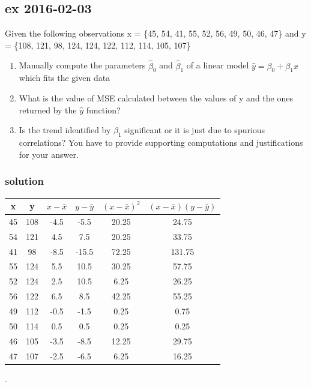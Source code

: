 \documentclass[a4paper,12pt,titlepage]{article} %
\begin{document}
\subsection{ex 2016-02-03}
Given the following observations x = \{45, 54, 41, 55, 52, 56, 49, 50, 46, 47\} and y = \{108, 121, 98, 124, 124, 122, 112, 114, 105, 107\}
\begin{enumerate}
\item Manually compute the parameters $ \hat{\beta}_{0} $ and $ \hat{\beta}_{1} $ of a linear model $ \hat{y} = \beta_{0} + \beta_{1} x $ which fits the given data
\item What is the value of MSE calculated between the values of y and the ones returned by the $ \hat{y} $ function?
\item Is the trend identified by $ \hat{\beta}_{1} $ significant or it is just due to spurious correlations? You have to provide supporting computations and justifications for your answer. 
\end{enumerate}

\subsubsection{solution}
  \begin{tabular}{|c|c|c|c|c|c|}
    \hline
    x & y & $ x - \bar{x} $ & $ y - \bar{y} $ & $ (x - \bar{x})^{2} $ & $ (x - \bar{x})(y - \bar{y}) $ \\
    \hline
    45	& 108	& -4.5	& -5.5	& 20.25	& 24.75 	\\
    \hline
    54	& 121	& 4.5	& 7.5	& 20.25	& 33.75 	\\
    \hline
    41	& 98	& -8.5	& -15.5	& 72.25	& 131.75	\\
    \hline
    55	& 124	& 5.5	& 10.5	& 30.25	& 57.75 	\\
    \hline
    52	& 124	& 2.5	& 10.5	& 6.25	& 26.25 	\\
    \hline
    56	& 122	& 6.5	& 8.5	& 42.25	& 55.25 	\\
    \hline
    49	& 112	& -0.5	& -1.5	& 0.25	& 0.75  	\\
    \hline
    50	& 114	& 0.5	& 0.5	& 0.25	& 0.25  	\\
    \hline
    46	& 105	& -3.5	& -8.5	& 12.25	& 29.75 	\\
    \hline
    47	& 107	& -2.5	& -6.5	& 6.25	& 16.25 	\\
    \hline
  \end{tabular}

.\\    
\end{document}
